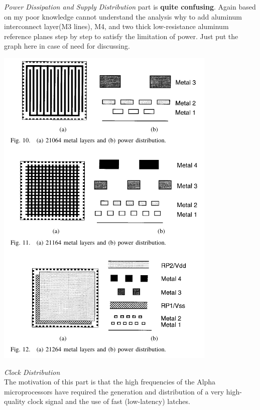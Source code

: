 \documentclass[11pt]{article}
\begin{document}
\textit{Power Dissipation and Supply Distribution} part is \textbf{quite confusing}. Again based on my poor knowledge cannot understand the analysis why to add aluminum interconnect layer(M3 lines), M4, and two thick low-resistance aluminum reference planes step by step to satisfy the limitation of power. Just put the graph here in case of need for discussing. \\
\begin{center}
\includegraphics[scale=0.5]{layers.png} 
\end{center}

\textit{Clock Distribution}\\
The motivation of this part is that the high frequencies of the Alpha microprocessors have required the generation and distribution of a very high-quality clock signal and the use of fast (low-latency) latches. 
\end{document}
